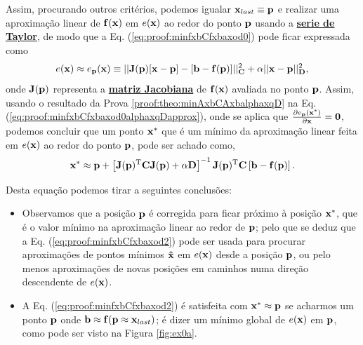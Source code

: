 \begin{myproofT}
Assim, procurando outros critérios, podemos igualar $\VECTOR{x}_{last}\equiv \VECTOR{p}$ e 
realizar uma aproximação linear de $\VECTOR{f}(\VECTOR{x})$ em $e(\VECTOR{x})$
ao redor do ponto $\VECTOR{p}$ usando a \hyperref[def:taylor]{\textbf{serie de Taylor}},
de modo que a Eq. (\ref{eq:proof:minfxbCfxbaxod0}) pode ficar expressada como
\begin{equation}\label{eq:proof:minfxbCfxbaxod0alphaxqDapprox}
e(\VECTOR{x}) \approx e_{\VECTOR{p}}(\VECTOR{x})  \equiv 
||\MATRIX{J}(\VECTOR{p})[\VECTOR{x}-\VECTOR{p}]-[\VECTOR{b}-\VECTOR{f}(\VECTOR{p})]||_{\MATRIX{C}}^2+
\alpha||\VECTOR{x}-\VECTOR{p}||_{\MATRIX{D}}^2,
\end{equation}
onde $\MATRIX{J}(\VECTOR{p})$ representa a \hyperref[def:jacobian]{\textbf{matriz Jacobiana}} 
de $\VECTOR{f}(\VECTOR{x})$ avaliada no ponto $\VECTOR{p}$.
Assim, usando o resultado da Prova \ref{proof:theo:minAxbCAxbalphaxqD} na Eq. (\ref{eq:proof:minfxbCfxbaxod0alphaxqDapprox}), 
onde se aplica que $\frac{\partial e_{\VECTOR{p}}(\VECTOR{x}^*)}{\partial \VECTOR{x} }=\VECTOR{0}$,
podemos concluir que um ponto $\VECTOR{x}^*$ que é 
um mínimo da aproximação linear feita em $e(\VECTOR{x})$ ao redor do ponto $\VECTOR{p}$,
pode ser achado como,
\begin{equation}\label{eq:proof:minfxbCfxbaxod2}
\VECTOR{x}^* \approx \VECTOR{p} +
\left[ \MATRIX{J}(\VECTOR{p})^{\transpose}\MATRIX{C} \MATRIX{J}(\VECTOR{p})+\alpha \MATRIX{D} \right]^{-1}
\MATRIX{J}(\VECTOR{p})^{\transpose}\MATRIX{C} \left[\VECTOR{b}-\VECTOR{f}(\VECTOR{p})\right].
\end{equation}

Desta equação podemos tirar a seguintes conclusões:
\begin{itemize}

\item Observamos que a posição $\VECTOR{p}$ é corregida para ficar próximo à posição $\VECTOR{x}^*$, 
que é o valor mínimo na aproximação linear ao redor de $\VECTOR{p}$;
pelo que se deduz que a Eq. (\ref{eq:proof:minfxbCfxbaxod2})
pode ser usada para procurar aproximações de pontos mínimos $\VECTOR{\hat{x}}$ em $e(\VECTOR{x})$ desde a posição $\VECTOR{p}$,
ou pelo menos aproximações de novas posições em caminhos numa direção descendente de $e(\VECTOR{x})$.

\item A Eq. (\ref{eq:proof:minfxbCfxbaxod2}) é satisfeita 
com $\VECTOR{x}^* \approx \VECTOR{p}$ se acharmos um  
ponto $\VECTOR{p}$ onde  $\VECTOR{b} \approx \VECTOR{f}(\VECTOR{p}\approx \VECTOR{x}_{last})$; 
é dizer um mínimo global de $e(\VECTOR{x})$ em $\VECTOR{p}$, como pode ser visto na Figura \ref{fig:ex0a}. 


\end{itemize}
\end{myproofT}
